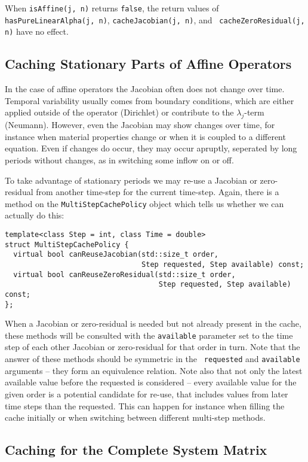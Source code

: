 \documentclass[11pt,a4paper,DIV11,%
notitlepage,oneside,abstracton,%
bibtotoc]{scrartcl}
\begin{document}
When {\tt isAffine(j, n)} returns {\tt false}, the return values of {\tt
  hasPureLinearAlpha(j, n)}, {\tt cacheJacobian(j, n)}, and {\tt
  cache\-Zero\-Residual(j, n)} have no effect.

\subsection{Caching Stationary Parts of Affine Operators}

In the case of affine operators the Jacobian often does not change over time.
Temporal variability usually comes from boundary conditions, which are either
applied outside of the operator (Dirichlet) or contribute to the
$\lambda_j$-term (Neumann).  However, even the Jacobian may show changes over
time, for instance when material properties change or when it is coupled to a
different equation.  Even if changes do occur, they may occur apruptly,
seperated by long periods without changes, as in switching some inflow on or
off.

To take advantage of stationary periods we may re-use a Jacobian or
zero-residual from another time-step for the current time-step.  Again, there
is a method on the {\tt MultiStepCachePolicy} object which tells us whether we
can actually do this:
\begin{lstlisting}
template<class Step = int, class Time = double>
struct MultiStepCachePolicy {
  virtual bool canReuseJacobian(std::size_t order,
                                Step requested, Step available) const;
  virtual bool canReuseZeroResidual(std::size_t order,
                                    Step requested, Step available) const;
};
\end{lstlisting}
When a Jacobian or zero-residual is needed but not already present in the
cache, these methods will be consulted with the {\tt available} parameter set
to the time step of each other Jacobian or zero-residual for that order in
turn.  Note that the answer of these methods should be symmetric in the {\tt
  requested} and {\tt available} arguments -- they form an equivalence
relation.  Note also that not only the latest available value before the
requested is considered -- every available value for the given order is a
potential candidate for re-use, that includes values from later time steps
than the requested.  This can happen for instance when filling the cache
initially or when switching between different multi-step methods.

\subsection{Caching for the Complete System Matrix}
\end{document}
